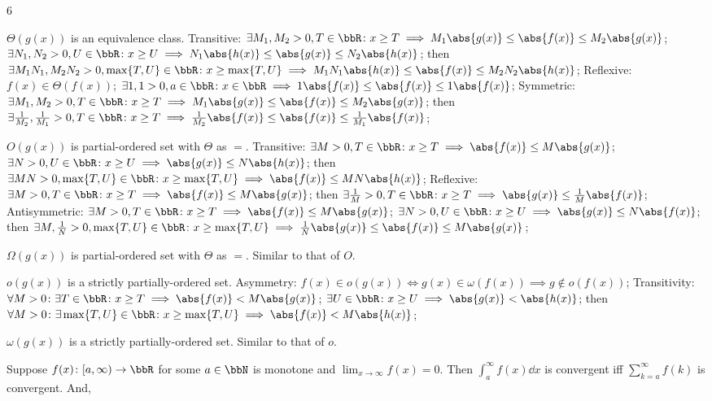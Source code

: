 \documentclass[a4paper,10pt]{extarticle}
\begin{document}
\begin{multicols}{6}


$\Theta(g(x))$ is an equivalence class.
\bpr
Transitive:
\(\exists M_1,M_2>0,T\in\bbR\colon x\ge T\implies M_1\abs{g(x)}\le\abs{f(x)}\le M_2\abs{g(x)}\); 
\(\exists N_1,N_2>0,U\in\bbR\colon x\ge U\implies N_1\abs{h(x)}\le\abs{g(x)}\le N_2\abs{h(x)}\); 
then
\(\exists M_1N_1,M_2N_2>0,\max\{T,U\}\in\bbR\colon x\ge \max\{T,U\}\implies M_1N_1\abs{h(x)}\le\abs{f(x)}\le M_2N_2\abs{h(x)}\); 
Reflexive:
\(f(x)\in\Theta(f(x))\); 
\(\exists 1,1>0,a\in\bbR\colon x\in\bbR\implies 1\abs{f(x)}\le\abs{f(x)}\le 1\abs{f(x)}\); 
Symmetric:
\(\exists M_1,M_2>0,T\in\bbR\colon x\ge T\implies M_1\abs{g(x)}\le\abs{f(x)}\le M_2\abs{g(x)}\); 
then
\(\exists \frac{1}{M_2},\frac{1}{M_1}>0,T\in\bbR\colon x\ge T\implies \frac{1}{M_2}\abs{f(x)}\le\abs{f(x)}\le\frac{1}{M_1}\abs{f(x)}\); 
\epr

$O(g(x))$ is partial-ordered set with $\Theta$ as $=$.
\bpr
Transitive:
\(\exists M>0,T\in\bbR\colon x\ge T\implies\abs{f(x)}\le M\abs{g(x)}\); 
\(\exists N>0,U\in\bbR\colon x\ge U\implies\abs{g(x)}\le N\abs{h(x)}\); 
then
\(\exists MN>0,\max\{T,U\}\in\bbR\colon x\ge\max\{T,U\}\implies\abs{f(x)}\le MN\abs{h(x)}\); 
Reflexive:
\(\exists M>0,T\in\bbR\colon x\ge T\implies\abs{f(x)}\le M\abs{g(x)}\); 
then
\(\exists \frac{1}{M}>0,T\in\bbR\colon x\ge T\implies\abs{g(x)}\le \frac{1}{M}\abs{f(x)}\); 
Antisymmetric:
\(\exists M>0,T\in\bbR\colon x\ge T\implies\abs{f(x)}\le M\abs{g(x)}\); 
\(\exists N>0,U\in\bbR\colon x\ge U\implies\abs{g(x)}\le N\abs{f(x)}\); 
then
\(\exists M,\frac{1}{N}>0,\max\{T,U\}\in\bbR\colon x\ge \max\{T,U\}\implies\frac{1}{N}\abs{g(x)}\le\abs{f(x)}\le M\abs{g(x)}\); 
\epr

$\Omega(g(x))$ is partial-ordered set with $\Theta$ as $=$.
\bpr
Similar to that of $O$.
\epr

$o(g(x))$ is a strictly partially-ordered set.
\bpr
Asymmetry:
\(f(x)\in o(g(x))\iff g(x)\in\omega(f(x))\implies g\notin o(f(x))\); 
Transitivity:
\(\forall M>0\colon\exists T\in\bbR\colon x\ge T\implies\abs{f(x)}<M\abs{g(x)}\); 
\(\exists U\in\bbR\colon x\ge U\implies\abs{g(x)}<\abs{h(x)}\); 
then
\(\forall M>0\colon\exists \max\{T,U\}\in\bbR\colon x\ge \max\{T,U\}\implies\abs{f(x)}<M\abs{h(x)}\); 
\epr

$\omega(g(x))$ is a strictly partially-ordered set.
\bpr
Similar to that of $o$.
\epr



Suppose $f(x)\colon[a,\infty)\to\bbR$ for some $a\in\bbN$ is monotone and $\lim_{x\to\infty}f(x)=0$. Then $\int_a^{\infty}f(x)\dd{x}$ is convergent iff $\sum_{k=a}^{\infty}f(k)$ is convergent. And,


\end{multicols}
\end{document}
